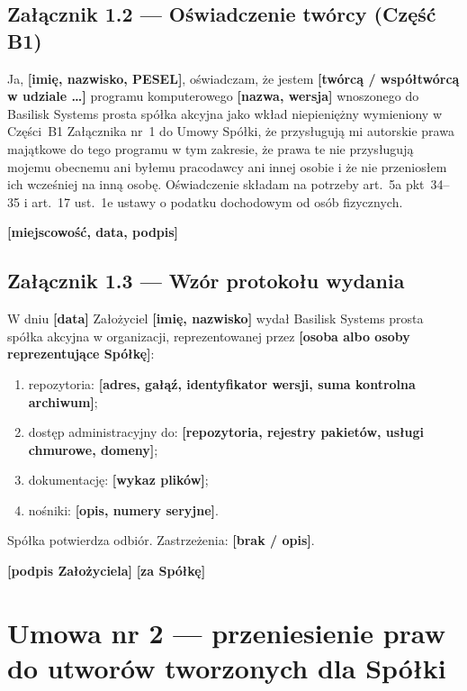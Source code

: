 \documentclass[12pt,a4paper]{report}
\newcounter{paragraf}
\newcommand{\field}[1]{\textbf{[#1]}}
\newcommand{\CompanyFull}{Basilisk Systems prosta spółka akcyjna}
\begin{document}
\section*{Załącznik 1.2 --- Oświadczenie twórcy (Część B1)}

Ja, \field{imię, nazwisko, PESEL}, oświadczam, że jestem \field{twórcą / współtwórcą w udziale \ldots} programu komputerowego \field{nazwa, wersja} wnoszonego do \CompanyFull{} jako wkład niepieniężny wymieniony w Części~B1 Załącznika nr~1 do Umowy Spółki, że przysługują mi autorskie prawa majątkowe do tego programu w tym zakresie, że prawa te nie przysługują mojemu obecnemu ani byłemu pracodawcy ani innej osobie i że nie przeniosłem ich wcześniej na inną osobę. Oświadczenie składam na potrzeby art.~5a pkt~34--35 i art.~17 ust.~1e ustawy o podatku dochodowym od osób fizycznych.

\field{miejscowość, data, podpis}

\section*{Załącznik 1.3 --- Wzór protokołu wydania}

W dniu \field{data} Założyciel \field{imię, nazwisko} wydał \CompanyFull{} w organizacji, reprezentowanej przez \field{osoba albo osoby reprezentujące Spółkę}:

\begin{enumerate}
  \item repozytoria: \field{adres, gałąź, identyfikator wersji, suma kontrolna archiwum};
  \item dostęp administracyjny do: \field{repozytoria, rejestry pakietów, usługi chmurowe, domeny};
  \item dokumentację: \field{wykaz plików};
  \item nośniki: \field{opis, numery seryjne}.
\end{enumerate}

Spółka potwierdza odbiór. Zastrzeżenia: \field{brak / opis}.

\field{podpis Założyciela} \hfill \field{za Spółkę}

\chapter*{Umowa nr 2 --- przeniesienie praw do utworów tworzonych dla Spółki}
\setcounter{paragraf}{0}
\end{document}
